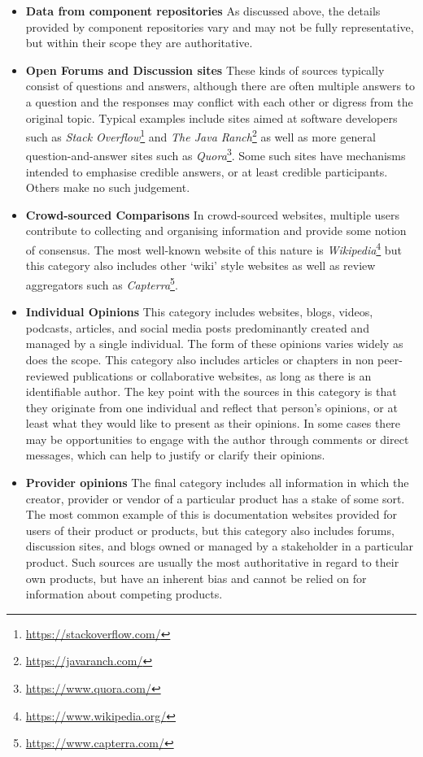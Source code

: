 \begin{itemize}
    \item \textbf{Data from component repositories} As discussed above, the details provided by component repositories vary and may not be fully representative, but within their scope they are authoritative.
    
    \item \textbf{Open Forums and Discussion sites} These kinds of sources typically consist of questions and answers, although there are often multiple answers to a question and the responses may conflict with each other or digress from the original topic. Typical examples include sites aimed at software developers such as \emph{Stack Overflow}\footnote{\url{https://stackoverflow.com/}} and \emph{The Java Ranch}\footnote{\url{https://javaranch.com/}} as well as more general question-and-answer sites such as \emph{Quora}\footnote{\url{https://www.quora.com/}}. Some such sites have mechanisms intended to emphasise credible answers, or at least credible participants. Others make no such judgement.
    
    \item \textbf{Crowd-sourced Comparisons} In crowd-sourced websites, multiple users contribute to collecting and organising information and provide some notion of consensus. The most well-known website of this nature is \emph{Wikipedia}\footnote{\url{https://www.wikipedia.org/}} but this category also includes other `wiki' style websites as well as review aggregators such as \emph{Capterra}\footnote{\url{https://www.capterra.com/}}.
    
    \item \textbf{Individual Opinions} This category includes websites, blogs, videos, podcasts, articles, and social media posts predominantly created and managed by a single individual. The form of these opinions varies widely as does the scope. This category also includes articles or chapters in non peer-reviewed publications or collaborative websites, as long as there is an identifiable author. The key point with the sources in this category is that they originate from one individual and reflect that person's opinions, or at least what they would like to present as their opinions. In some cases there may be opportunities to engage with the author through comments or direct messages, which can help to justify or clarify their opinions.
    
    \item \textbf{Provider opinions} The final category includes all information in which the creator, provider or vendor of a particular product has a stake of some sort. The most common example of this is documentation websites provided for users of their product or products, but this category also includes forums, discussion sites, and blogs owned or managed by a stakeholder in a particular product. Such sources are usually the most authoritative in regard to their own products, but have an inherent bias and cannot be relied on for information about competing products.
\end{itemize}

